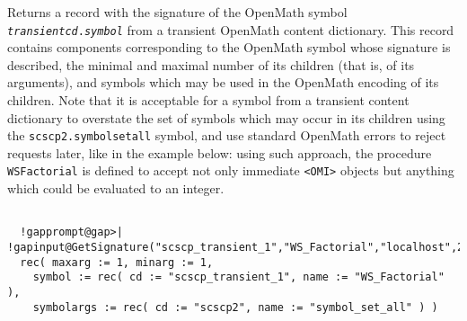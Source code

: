 \documentclass[a4paper,11pt]{report}
\begin{document}
{{{ Returns a record with the signature of the \textsf{OpenMath} symbol \mbox{\texttt{\mdseries\slshape transientcd}}\texttt{.}\mbox{\texttt{\mdseries\slshape symbol}} from a transient \textsf{OpenMath} content dictionary. This record contains components corresponding to the \textsf{OpenMath} symbol whose signature is described, the minimal and maximal number of its
children (that is, of its arguments), and symbols which may be used in the \textsf{OpenMath} encoding of its children. Note that it is acceptable for a symbol from a
transient content dictionary to overstate the set of symbols which may occur
in its children using the \texttt{scscp2.symbol{\textunderscore}set{\textunderscore}all} symbol, and use standard \textsf{OpenMath} errors to reject requests later, like in the example below: using such
approach, the procedure \texttt{WS{\textunderscore}Factorial} is defined to accept not only immediate \texttt{{\textless}OMI{\textgreater}} objects but anything which could be evaluated to an integer. 
\begin{Verbatim}[commandchars=!@|,fontsize=\small,frame=single,label=Example]
  
  !gapprompt@gap>| !gapinput@GetSignature("scscp_transient_1","WS_Factorial","localhost",26133);|
  rec( maxarg := 1, minarg := 1,
    symbol := rec( cd := "scscp_transient_1", name := "WS_Factorial" ),
    symbolargs := rec( cd := "scscp2", name := "symbol_set_all" ) )
  
\end{Verbatim}
 }

 }

 }

 
\end{document}
